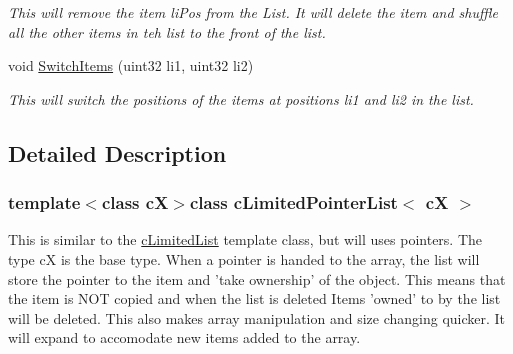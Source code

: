 \begin{DoxyCompactItemize}
\begin{DoxyCompactList}\small\item\em This will remove the item liPos from the List. It will delete the item and shuffle all the other items in teh list to the front of the list. \end{DoxyCompactList}\item 
\hypertarget{classc_limited_pointer_list_ad2981a22dcb5e79790b8644125cc7322}{
void \hyperlink{classc_limited_pointer_list_ad2981a22dcb5e79790b8644125cc7322}{SwitchItems} (uint32 li1, uint32 li2)}
\label{classc_limited_pointer_list_ad2981a22dcb5e79790b8644125cc7322}

\begin{DoxyCompactList}\small\item\em This will switch the positions of the items at positions li1 and li2 in the list. \end{DoxyCompactList}\end{DoxyCompactItemize}


\subsection{Detailed Description}
\subsubsection*{template$<$class cX$>$class cLimitedPointerList$<$ cX $>$}

This is similar to the \hyperlink{classc_limited_list}{cLimitedList} template class, but will uses pointers. The type cX is the base type. When a pointer is handed to the array, the list will store the pointer to the item and 'take ownership' of the object. This means that the item is NOT copied and when the list is deleted Items 'owned' to by the list will be deleted. This also makes array manipulation and size changing quicker. It will expand to accomodate new items added to the array. 